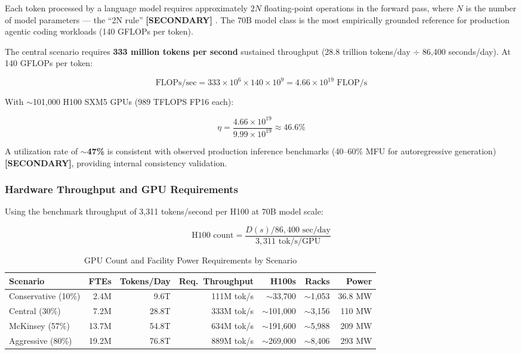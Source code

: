 \documentclass{article}
\newcommand{\SECONDARY}{\textbf{[SECONDARY]}}
\begin{document}
Each token processed by a language model requires approximately $2N$ floating-point
operations in the forward pass, where $N$ is the number of model parameters --- the
``2N rule'' \SECONDARY{} \citep{epochai2023scaling}. The 70B model class is the most empirically grounded reference
for production agentic coding workloads (140 GFLOPs per token).

The central scenario requires \textbf{333 million tokens per second} sustained throughput
(28.8 trillion tokens/day $\div$ 86,400 seconds/day). At 140 GFLOPs per token:

\[
\text{FLOPs/sec} = 333 \times 10^6 \times 140 \times 10^9 = 4.66 \times 10^{19} \text{ FLOP/s}
\]

With $\sim$101,000 H100 SXM5 GPUs (989 TFLOPS FP16 each):

\[
\eta = \frac{4.66 \times 10^{19}}{9.99 \times 10^{19}} \approx 46.6\%
\]

A utilization rate of \textbf{$\sim$47\%} is consistent with observed production
inference benchmarks (40--60\% MFU for autoregressive generation) \SECONDARY{}, providing
internal consistency validation.

\subsubsection{Hardware Throughput and GPU Requirements}

Using the benchmark throughput of 3,311 tokens/second per H100 at 70B model scale:

\[
\text{H100 count} = \frac{D(s) / 86{,}400 \text{ sec/day}}{3{,}311 \text{ tok/s/GPU}}
\]

\begin{table}[ht]
\centering
\caption{GPU Count and Facility Power Requirements by Scenario}
\label{tab:gpu-count}
\small
\begin{tabular}{@{}lrrrrrr@{}}
\toprule
\textbf{Scenario} & \textbf{FTEs} & \textbf{Tokens/Day} & \textbf{Req.\ Throughput} & \textbf{H100s} & \textbf{Racks} & \textbf{Power} \\
\midrule
Conservative (10\%) & 2.4M & 9.6T & 111M tok/s & $\sim$33,700 & $\sim$1,053 & 36.8 MW \\
Central (30\%) & 7.2M & 28.8T & 333M tok/s & $\sim$101,000 & $\sim$3,156 & 110 MW \\
McKinsey (57\%) & 13.7M & 54.8T & 634M tok/s & $\sim$191,600 & $\sim$5,988 & 209 MW \\
Aggressive (80\%) & 19.2M & 76.8T & 889M tok/s & $\sim$269,000 & $\sim$8,406 & 293 MW \\
\bottomrule
\end{tabular}
\end{table}
\end{document}
